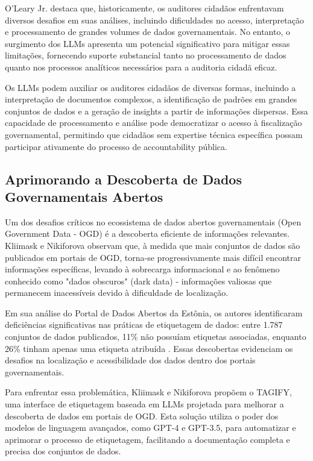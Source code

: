 O'Leary Jr. \cite{ref_5} destaca que, historicamente, os auditores cidadãos enfrentavam diversos desafios em suas análises, incluindo dificuldades no acesso, interpretação e processamento de grandes volumes de dados governamentais. No entanto, o surgimento dos LLMs apresenta um potencial significativo para mitigar essas limitações, fornecendo suporte substancial tanto no processamento de dados quanto nos processos analíticos necessários para a auditoria cidadã eficaz.

Os LLMs podem auxiliar os auditores cidadãos de diversas formas, incluindo a interpretação de documentos complexos, a identificação de padrões em grandes conjuntos de dados e a geração de insights a partir de informações dispersas. Essa capacidade de processamento e análise pode democratizar o acesso à fiscalização governamental, permitindo que cidadãos sem expertise técnica específica possam participar ativamente do processo de accountability pública.

\subsection{Aprimorando a Descoberta de Dados Governamentais Abertos}

Um dos desafios críticos no ecossistema de dados abertos governamentais (Open Government Data - OGD) é a descoberta eficiente de informações relevantes. Kliimask e Nikiforova \cite{Kliimask2024_01} observam que, à medida que mais conjuntos de dados são publicados em portais de OGD, torna-se progressivamente mais difícil encontrar informações específicas, levando à sobrecarga informacional e ao fenômeno conhecido como "dados obscuros" (dark data) - informações valiosas que permanecem inacessíveis devido à dificuldade de localização.

Em sua análise do Portal de Dados Abertos da Estônia, os autores identificaram deficiências significativas nas práticas de etiquetagem de dados: entre 1.787 conjuntos de dados publicados, 11\% não possuíam etiquetas associadas, enquanto 26\% tinham apenas uma etiqueta atribuída \cite{Kliimask2024_01}. Essas descobertas evidenciam os desafios na localização e acessibilidade dos dados dentro dos portais governamentais.

Para enfrentar essa problemática, Kliimask e Nikiforova \cite{Kliimask2024_01} propõem o TAGIFY, uma interface de etiquetagem baseada em LLMs projetada para melhorar a descoberta de dados em portais de OGD. Esta solução utiliza o poder dos modelos de linguagem avançados, como GPT-4 e GPT-3.5, para automatizar e aprimorar o processo de etiquetagem, facilitando a documentação completa e precisa dos conjuntos de dados.

